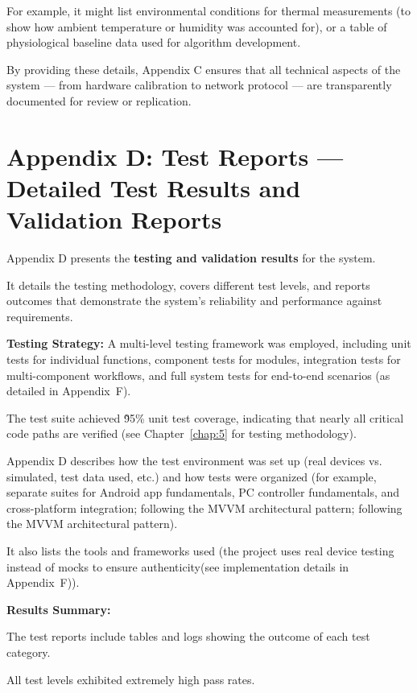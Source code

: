 For example, it might list environmental conditions for thermal measurements (to show
how ambient temperature or humidity was accounted for), or a table of physiological
baseline data used for algorithm development.

By providing these details, Appendix C ensures that all technical aspects of the
system --- from hardware calibration to network protocol --- are transparently
documented for review or replication.

\section{Appendix D: Test Reports --- Detailed Test Results and Validation Reports}

Appendix D presents the \textbf{testing and validation results}
 for the system.

It details the testing methodology, covers different test levels, and reports
outcomes that demonstrate the system's reliability and performance against
requirements.

\textbf{Testing Strategy:}
 A multi-level testing framework was employed, including unit tests for individual
 functions, component tests for modules, integration tests for multi-component
 workflows, and full system tests for end-to-end scenarios (as detailed in
 Appendix~F).

The test suite achieved \~95\% unit test coverage, indicating that nearly all
critical code paths are verified (see Chapter~\ref{chap:5} for testing methodology).

Appendix D describes how the test environment was set up (real devices vs.
simulated, test data used, etc.) and how tests were organized (for example, separate
suites for Android app fundamentals, PC controller fundamentals, and cross-platform
integration; following the MVVM architectural pattern; following the MVVM
architectural pattern).

It also lists the tools and frameworks used (the project uses real device testing
instead of mocks to ensure authenticity(see implementation details in Appendix~F)).

\textbf{Results Summary:}

The test reports include tables and logs showing the outcome of each test category.

All test levels exhibited extremely high pass rates.

